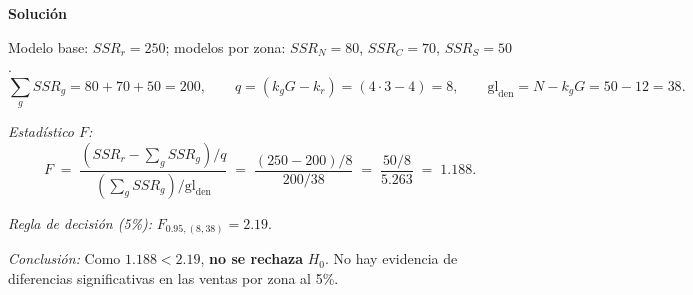 \documentclass[10pt,a4paper]{article}
\begin{document}
\begin{enumerate}
\textbf{Solución}

Modelo base: $SSR_r=250$; modelos por zona: $SSR_N=80$, $SSR_C=70$, $SSR_S=50$.
\[
\sum_g SSR_g = 80+70+50 = 200,\qquad
q = (k_g G - k_r) = (4\cdot 3 - 4) = 8,\qquad
\text{gl}_{\text{den}} = N - k_g G = 50 - 12 = 38.
\]

\textit{Estadístico $F$:}
\[
F \;=\; \frac{(SSR_r-\sum_g SSR_g)/q}{\left(\sum_g SSR_g\right)/\text{gl}_{\text{den}}}
\;=\;
\frac{(250-200)/8}{200/38}
\;=\;
\frac{50/8}{5.263}
\;=\; 1.188.
\]

\textit{Regla de decisión (5\%):}\quad
$F_{0.95,(8,38)}=2.19$.

\textit{Conclusión:}\quad
Como $1.188<2.19$, \textbf{no se rechaza} $H_0$. No hay evidencia de diferencias significativas en las ventas por zona al 5\%.

\end{enumerate}
\end{document}

